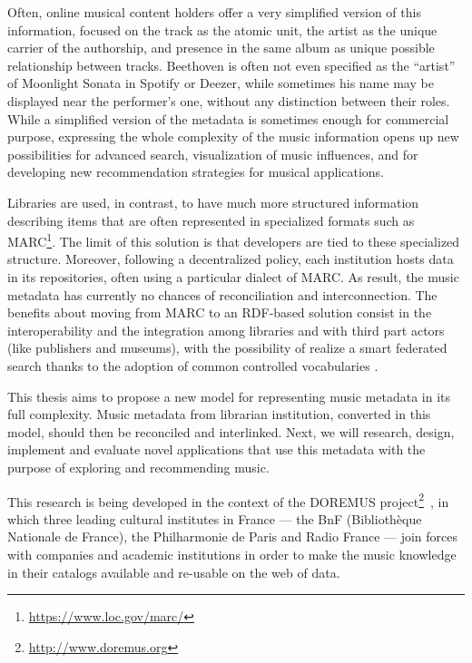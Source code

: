 \documentclass{llncs}
\begin{document}
Often, online musical content holders offer a very simplified version of this information, focused on the track as the atomic unit, the artist as the unique carrier of the authorship, and presence in the same album as unique possible relationship between tracks. Beethoven is often not even specified as the ``artist'' of Moonlight Sonata in Spotify or Deezer, while sometimes his name may be displayed near the performer's one, without any distinction between their roles. While a simplified version of the metadata is sometimes enough for commercial purpose, expressing the whole complexity of the music information opens up new possibilities for advanced search, visualization of music influences, and for developing new recommendation strategies for musical applications.

Libraries are used, in contrast, to have much more structured information describing items that are often represented in specialized formats such as MARC\footnote{\url{https://www.loc.gov/marc/}}. The limit of this solution is that developers are tied to these specialized structure. Moreover, following a decentralized policy, each institution hosts data in its repositories, often using a particular dialect of MARC. As result, the music metadata has currently no chances of reconciliation and interconnection. The benefits about moving from MARC to an RDF-based solution consist in the interoperability and the integration among libraries and with third part actors (like publishers and museums), with the possibility of realize a smart federated search thanks to the adoption of common controlled vocabularies \cite{byrne2010strongest}.

This thesis aims to propose a new model for representing music metadata in its full complexity. Music metadata from librarian institution, converted in this model, should then be reconciled and interlinked. Next, we will research, design, implement and evaluate novel applications that use this metadata with the purpose of exploring and recommending music.

This research is being developed in the context of the DOREMUS project\footnote{\url{http://www.doremus.org}}~\cite{achichidoremus}, in which three leading cultural institutes in France --- the BnF (Biblioth\`eque Nationale de France), the Philharmonie de Paris and Radio France --- join forces with companies and academic institutions in order to make the music knowledge in their catalogs available and re-usable on the web of data.
\end{document}
